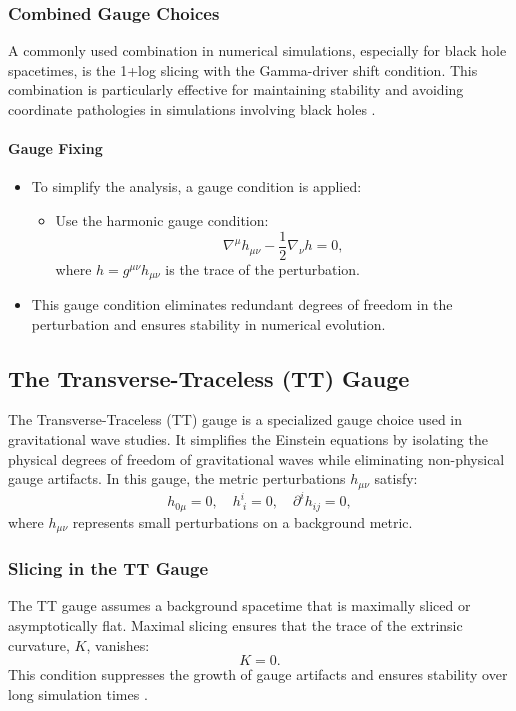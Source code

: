 \documentclass[12pt]{article}
\begin{document}
\subsubsection{Combined Gauge Choices}
A commonly used combination in numerical simulations, especially for black hole spacetimes, is the 1+log slicing with the Gamma-driver shift condition. This combination is particularly effective for maintaining stability and avoiding coordinate pathologies in simulations involving black holes \cite{campanelli2006accurate,baker2006gravitational}.


\paragraph{Gauge Fixing}
\begin{itemize}
    \item To simplify the analysis, a gauge condition is applied:
    \begin{itemize}
        \item Use the harmonic gauge condition:
        \[
        \nabla^\mu h_{\mu\nu} - \frac{1}{2} \nabla_\nu h = 0,
        \]
        where $h = g^{\mu\nu} h_{\mu\nu}$ is the trace of the perturbation.
    \end{itemize}
    \item This gauge condition eliminates redundant degrees of freedom in the perturbation and ensures stability in numerical evolution.
\end{itemize}


\subsection{The Transverse-Traceless (TT) Gauge}
The Transverse-Traceless (TT) gauge is a specialized gauge choice used in gravitational wave studies. It simplifies the Einstein equations by isolating the physical degrees of freedom of gravitational waves while eliminating non-physical gauge artifacts. In this gauge, the metric perturbations $h_{\mu\nu}$ satisfy:
\[
h_{0\mu} = 0, \quad h^i_{\ i} = 0, \quad \partial^i h_{ij} = 0,
\]
where $h_{\mu\nu}$ represents small perturbations on a background metric.

\subsubsection{Slicing in the TT Gauge}
The TT gauge assumes a background spacetime that is maximally sliced or asymptotically flat. Maximal slicing ensures that the trace of the extrinsic curvature, $K$, vanishes:
\[
K = 0.
\]
This condition suppresses the growth of gauge artifacts and ensures stability over long simulation times \cite{baumgarte2010numerical}.
\end{document}
